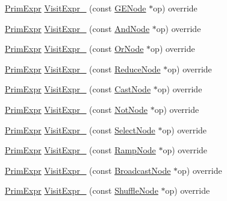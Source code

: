 \begin{DoxyCompactItemize}
\item 
\hyperlink{classtvm_1_1PrimExpr}{Prim\+Expr} \hyperlink{classtvm_1_1tir_1_1ExprMutator_aabb9f6232b3ab527bd34293bb2c9d047}{Visit\+Expr\+\_\+} (const \hyperlink{classtvm_1_1tir_1_1GENode}{G\+E\+Node} $\ast$op) override
\item 
\hyperlink{classtvm_1_1PrimExpr}{Prim\+Expr} \hyperlink{classtvm_1_1tir_1_1ExprMutator_ac8f8e578e5a375dc472b822736e5a78b}{Visit\+Expr\+\_\+} (const \hyperlink{classtvm_1_1tir_1_1AndNode}{And\+Node} $\ast$op) override
\item 
\hyperlink{classtvm_1_1PrimExpr}{Prim\+Expr} \hyperlink{classtvm_1_1tir_1_1ExprMutator_a67c6648dbec499b4c3bb825b6610b2c7}{Visit\+Expr\+\_\+} (const \hyperlink{classtvm_1_1tir_1_1OrNode}{Or\+Node} $\ast$op) override
\item 
\hyperlink{classtvm_1_1PrimExpr}{Prim\+Expr} \hyperlink{classtvm_1_1tir_1_1ExprMutator_a54677bf1b2cec622c781ba6ed4e03af9}{Visit\+Expr\+\_\+} (const \hyperlink{classtvm_1_1tir_1_1ReduceNode}{Reduce\+Node} $\ast$op) override
\item 
\hyperlink{classtvm_1_1PrimExpr}{Prim\+Expr} \hyperlink{classtvm_1_1tir_1_1ExprMutator_a0fc3e6d6e34c31aa132f697a3d1be7d4}{Visit\+Expr\+\_\+} (const \hyperlink{classtvm_1_1tir_1_1CastNode}{Cast\+Node} $\ast$op) override
\item 
\hyperlink{classtvm_1_1PrimExpr}{Prim\+Expr} \hyperlink{classtvm_1_1tir_1_1ExprMutator_afbd5d1454529710c5ab5ddb17eca75ab}{Visit\+Expr\+\_\+} (const \hyperlink{classtvm_1_1tir_1_1NotNode}{Not\+Node} $\ast$op) override
\item 
\hyperlink{classtvm_1_1PrimExpr}{Prim\+Expr} \hyperlink{classtvm_1_1tir_1_1ExprMutator_a3bc473fd37451c435cc46d1191446951}{Visit\+Expr\+\_\+} (const \hyperlink{classtvm_1_1tir_1_1SelectNode}{Select\+Node} $\ast$op) override
\item 
\hyperlink{classtvm_1_1PrimExpr}{Prim\+Expr} \hyperlink{classtvm_1_1tir_1_1ExprMutator_a4c2ba005e353a9cbf171c7fa019ef727}{Visit\+Expr\+\_\+} (const \hyperlink{classtvm_1_1tir_1_1RampNode}{Ramp\+Node} $\ast$op) override
\item 
\hyperlink{classtvm_1_1PrimExpr}{Prim\+Expr} \hyperlink{classtvm_1_1tir_1_1ExprMutator_a26ea1a3a8efcf9319349533ba3e69456}{Visit\+Expr\+\_\+} (const \hyperlink{classtvm_1_1tir_1_1BroadcastNode}{Broadcast\+Node} $\ast$op) override
\item 
\hyperlink{classtvm_1_1PrimExpr}{Prim\+Expr} \hyperlink{classtvm_1_1tir_1_1ExprMutator_a8e7e4d5ed12604f8c6019dd6d7cf93b8}{Visit\+Expr\+\_\+} (const \hyperlink{classtvm_1_1tir_1_1ShuffleNode}{Shuffle\+Node} $\ast$op) override

\end{DoxyCompactItemize}
